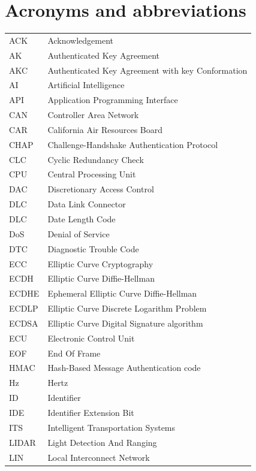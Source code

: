\documentclass[master=cws,masteroption=vs,english]{kulemt}
\begin{document}
	

	


\section{Acronyms and abbreviations}
\begin{tabular}{ l l }
	ACK & Acknowledgement \\
	AK & Authenticated Key Agreement \\
	AKC & Authenticated Key Agreement with key Conformation \\
	AI & Artificial Intelligence \\
	API & Application Programming Interface \\
	CAN & Controller Area Network \\
	CAR & California Air Resources Board \\
	CHAP & Challenge-Handshake Authentication Protocol \\
	CLC & Cyclic Redundancy Check \\
	CPU & Central Processing Unit \\
	DAC & Discretionary Access Control \\
	DLC & Data Link Connector \\
	DLC & Date Length Code \\
	DoS & Denial of Service \\
	DTC & Diagnostic Trouble Code \\
	ECC & Elliptic Curve Cryptography \\
	ECDH & Elliptic Curve Diffie-Hellman \\
	ECDHE & Ephemeral Elliptic Curve Diffie-Hellman \\
	ECDLP & Elliptic Curve Discrete Logarithm Problem \\
	ECDSA & Elliptic Curve Digital Signature algorithm \\
	ECU & Electronic Control Unit \\
	EOF & End Of Frame \\
	HMAC & Hash-Based Message Authentication code \\
	Hz & Hertz \\
	ID & Identifier \\
	IDE & Identifier Extension Bit \\
	ITS & Intelligent Transportation Systems \\
	LIDAR & Light Detection And Ranging \\
	LIN & Local Interconnect Network \\

\end{tabular}
\end{document}
